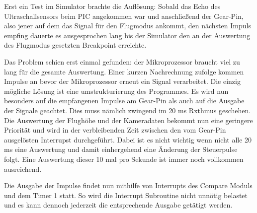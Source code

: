 Erst ein Test im Simulator brachte die Auflösung: Sobald das Echo des Ultraschallsensors beim PIC angekommen war und anschließend der Gear-Pin, also jener auf dem das Signal für den Flugmodus ankommt, den nächsten Impuls empfing dauerte es ausgesprochen lang bis der Simulator den an der Auswertung des Flugmodus gesetzten Breakpoint erreichte.

Das Problem schien erst einmal gefunden: der Mikroprozessor braucht viel zu lang für die gesamte Auswertung. Einer kurzen Nachrechnung zufolge kommen  Impulse an bevor der Mikroprozessor erneut ein Signal verarbeitet.
Die einzig mögliche Lösung ist eine umstrukturierung des Programmes. Es wird nun besonders auf die empfangenen Impulse am Gear-Pin als auch auf die Ausgabe der Signale geachtet. Dies muss nämlich zwingend im 20 ms Rxthmus geschehen.
Die Auswertung der Flughöhe und der Kameradaten bekommt nun eine geringere Priorität und wird in der verbleibenden Zeit zwischen den vom Gear-Pin ausgelösten Interrupst durchgeführt. Dabei ist es nicht wichtig wenn nicht alle 20 ms eine Auswertung und damit einhergehend eine Änderung der Steuerpulse folgt. Eine Auswertung dieser 10 mal pro Sekunde ist immer noch vollkommen ausreichend.

Die Ausgabe der Impulse findet nun mithilfe von Interrupts des Compare Moduls und dem Timer 1 statt. So wird die Interrupt Subroutine nicht unnötig belastet und es kann dennoch jederzeit die entsprechende Ausgabe getätigt werden.
